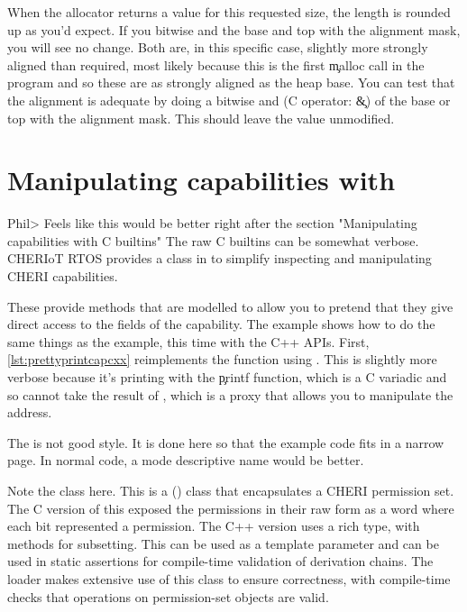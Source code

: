 {{{{{{{{When the allocator returns a value for this requested size, the length is rounded up as you'd expect.
If you bitwise and the base and top with the alignment mask, you will see no change.
Both are, in this specific case, slightly more strongly aligned than required, most likely because this is the first \c{malloc} call in the program and so these are as strongly aligned as the heap base.
You can test that the alignment is adequate by doing a bitwise and (C operator: \c{&}) of the base or top with the alignment mask.
This should leave the value unmodified.

\section[label=cheri_capability_cpp]{Manipulating capabilities with }
Phil> Feels like this would be better right after the section "Manipulating capabilities with C builtins"
The raw C builtins can be somewhat verbose.
CHERIoT RTOS provides a  class in  to simplify inspecting and manipulating CHERI capabilities.

These provide methods that are modelled to allow you to pretend that they give direct access to the fields of the capability.
The  example shows how to do the same things as the  example, this time with the C++ APIs.
First, \ref{lst:prettyprintcapcxx} reimplements the  function using .
This is slightly more verbose because it's printing with the \c{printf} function, which is a C variadic and so cannot take the result of , which is a proxy that allows you to manipulate the address.

\codelisting[filename=examples/manipulate_capabilities_cxx/example.cc,marker=print_capability,label=lst:prettyprintcapcxx,caption="Pretty printing a capability using the C++ APIs."]{}

\begin{note}
The  is not good style.
It is done here so that the example code fits in a narrow page.
In normal code, a mode descriptive name would be better.
\end{note}

Note the  class here.
This is a () class that encapsulates a CHERI permission set.
The C version of this exposed the permissions in their raw form as a word where each bit represented a permission.
The C++ version uses a rich type, with methods for subsetting.
This can be used as a template parameter and can be used in static assertions for compile-time validation of derivation chains.
The loader makes extensive use of this class to ensure correctness, with compile-time checks that operations on permission-set objects are valid.

}}}}}}}}
